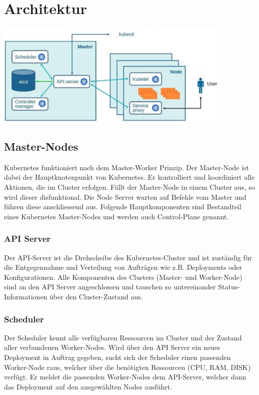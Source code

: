 \section{Architektur}
\begin{center}
	\includegraphics[height=50mm]{media/architektur.png}
\end{center}
\subsection{Master-Nodes}
Kubernetes funktioniert nach dem Master-Worker Prinzip.
Der Master-Node ist dabei der Hauptknotenpunkt von Kubernetes. Er kontrolliert und koordiniert alle Aktionen, die im Cluster erfolgen. Fällt der Master-Node in einem Cluster aus, so wird dieser disfunktional. Die Node Server warten auf Befehle vom Master und führen diese anschliessend aus. Folgende Hauptkomponenten sind Bestandteil eines Kubernetes Master-Nodes und werden auch Control-Plane genannt.  \cite{kubernetes}
\subsubsection{API Server}
Der API-Server ist die Drehscheibe des Kubernetes-Cluster und ist zuständig für die Entgegennahme und Verteilung von Aufträgen wie z.B. Deployments oder Konfigurationen. Alle Komponenten des Clusters (Master- und Worker-Node) sind an den API Server angeschlossen und tauschen so untereinander Status-Informationen über den Cluster-Zustand aus. \cite{kubernetes}
\subsubsection{Scheduler}
Der Scheduler kennt alle verfügbaren Ressourcen im Cluster und der Zustand aller verbundenen Worker-Nodes. Wird über den API Server ein neues Deployment in Auftrag gegeben, sucht sich der Scheduler einen passenden Worker-Node raus, welcher über die benötigten Ressourcen (CPU, RAM, DISK) verfügt. Er meldet die passenden Worker-Nodes dem API-Server, welcher dann das Deployment auf den ausgewählten Nodes ausführt. \cite{kubernetes}
